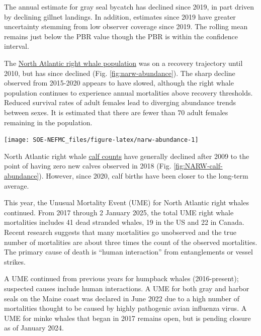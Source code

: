 \documentclass[
  10pt,
]{article}
\let\origfigure\figure
\let\endorigfigure\endfigure
\renewenvironment{figure}[1][2] {
    \expandafter\origfigure\expandafter[H]
} {
    \endorigfigure
}
\begin{document}
The annual estimate for gray seal bycatch has declined since 2019, in part driven by declining gillnet landings. In addition, estimates since 2019 have greater uncertainty stemming from low observer coverage since 2019. The rolling mean remains just below the PBR value though the PBR is within the confidence interval.

The \href{https://noaa-edab.github.io/catalog/narw.html}{North Atlantic right whale population} was on a recovery trajectory until 2010, but has since declined (Fig. \ref{fig:narw-abundance}). The sharp decline observed from 2015-2020 appears to have slowed, although the right whale population continues to experience annual mortalities above recovery thresholds. Reduced survival rates of adult females lead to diverging abundance trends between sexes. It is estimated that there are fewer than 70 adult females remaining in the population.

\begin{figure}

{\centering \texttt{[image: SOE-NEFMC\_files/figure-latex/narw-abundance-1]} 

}

\caption{Estimated North Atlanic right whale abundance on the Northeast Shelf.}\label{fig:narw-abundance}
\end{figure}

North Atlantic right whale \href{https://noaa-edab.github.io/catalog/narw.html}{calf counts} have generally declined after 2009 to the point of having zero new calves observed in 2018 (Fig. \ref{fig:NARW-calf-abundance}). However, since 2020, calf births have been closer to the long-term average.

This year, the Unusual Mortality Event (UME) for North Atlantic right whales continued. From 2017 through 2 January 2025, the total UME right whale mortalities includes 41 dead stranded whales, 19 in the US and 22 in Canada. Recent research suggests that many mortalities go unobserved and the true number of mortalities are about three times the count of the observed mortalities. The primary cause of death is ``human interaction'' from entanglements or vessel strikes.

A UME continued from previous years for humpback whales (2016-present); suspected causes include human interactions. A UME for both gray and harbor seals on the Maine coast was declared in June 2022 due to a high number of mortalities thought to be caused by highly pathogenic avian influenza virus. A UME for minke whales that began in 2017 remains open, but is pending closure as of January 2024.
\end{document}
